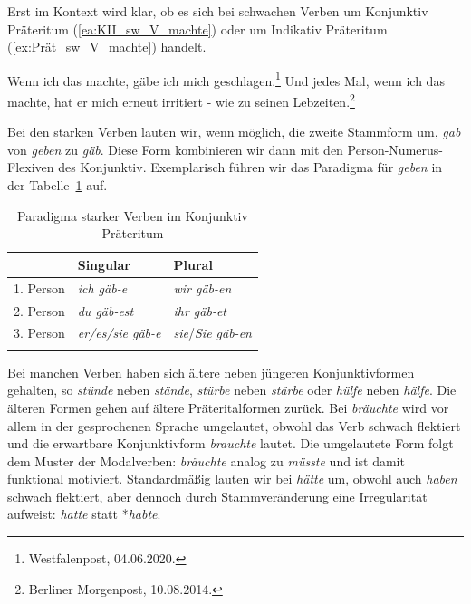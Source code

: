 Erst im Kontext wird klar, ob es sich bei schwachen Verben um Konjunktiv Präteritum (\ref{ea:KII_sw_V_machte}) oder um Indikativ Präteritum (\ref{ex:Prät_sw_V_machte}) handelt.

\ea \label{ea:KII_sw_V}
\ea \label{ea:KII_sw_V_machte} Wenn ich das machte, gäbe ich mich geschlagen.\footnote{Westfalenpost, 04.06.2020.}
\ex \label{ex:Prät_sw_V_machte} Und jedes Mal, wenn ich das machte, hat er mich erneut irritiert - wie zu seinen Lebzeiten.\footnote{Berliner Morgenpost, 10.08.2014.}
\z 
\z 

Bei den starken Verben lauten wir, wenn möglich, die zweite Stammform um, \zB \textit{gab} von \textit{geben} zu \textit{gäb}. Diese Form kombinieren wir dann mit den Person-Numerus-Flexiven des Konjunktiv. Exemplarisch führen wir das Paradigma für \textit{geben} in der Tabelle~\ref{tab:KonjII_Prät_st_V} auf.

\begin{table}
  \centering
  \begin{tabular}{l l l}
    \lsptoprule
    & Singular & Plural \\
    \hline
    1. Person & \textit{ich gäb-e}  & \textit{wir gäb-en} \\
    
    2. Person & \textit{du gäb-est}  & \textit{ihr gäb-et} \\
    
    3. Person & \textit{er/es/sie gäb-e} & \textit{sie}/\textit{Sie gäb-en} \\
    \lspbottomrule 
  \end{tabular}
  \caption{Paradigma starker Verben im Konjunktiv Präteritum}
  \label{tab:KonjII_Prät_st_V}
\end{table}

Bei manchen Verben haben sich ältere neben jüngeren Konjunktivformen gehalten, so \zB \textit{stünde} neben \textit{stände}, \textit{stürbe} neben \textit{stärbe} oder \textit{hülfe} neben \textit{hälfe}. Die älteren Formen gehen auf ältere Präteritalformen zurück. Bei \textit{bräuchte} wird vor allem in der gesprochenen Sprache umgelautet, obwohl das Verb schwach flektiert und die erwartbare Konjunktivform \textit{brauchte} lautet. Die umgelautete Form folgt dem Muster der Modalverben: \textit{bräuchte} analog zu \textit{müsste} und ist damit funktional motiviert. Standardmäßig lauten wir bei \textit{hätte} um, obwohl auch \textit{haben} schwach flektiert, aber dennoch durch Stammveränderung eine Irregularität aufweist: \textit{hatte} statt *\textit{habte}. 

